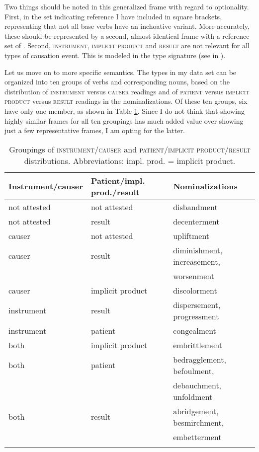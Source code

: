 Two things should be noted in this generalized frame with regard to optionality. 
First, in the set indicating reference I have included  in square brackets, representing that not all base verbs have an inchoative variant. More accurately, these should be represented by a second,  almost identical frame with a reference set of . 
Second, \textsc{instrument}, \textsc{implicit product} and \textsc{result} are not relevant for all types of causation event. This is modeled in the type signature (see  in ).

Let us move on to more specific semantics. The types in my data set can be organized into ten groups of verbs and corresponding nouns, based on the distribution of \textsc{instrument} versus \textsc{causer} readings and of \textsc{patient} versus \textsc{implicit product} versus \textsc{result} readings in the nominalizations. Of these ten groups, six have only one member, as shown in Table \ref{tab:overview-distributions}. Since I do not think that showing highly similar frames for all ten groupings has much added value over showing just a few representative frames, I am opting for the latter. 
\begin{table}
  \centering 
    \caption[Groupings of \textsc{instrument/causer} and \textsc{implicit product/patient/result} distributions]{\label{tab:overview-distributions}Groupings of \textsc{instrument/causer} and \textsc{patient/implicit product/result} distributions. Abbreviations: impl. prod. = implicit product.}
    \begin{tabular}{p{}<{\raggedright} p{4cm}<{\raggedright} p{}<{\raggedright}}
      \lsptoprule
      Instrument/causer & Patient/impl. prod./result &  Nominalizations \\
      \midrule
       not attested & not attested & disbandment \\
      not attested & result & decenterment  \\
       causer & not attested & upliftment  \\
      causer & result & diminishment, increasement,   \\
      && worsenment\\
       causer & implicit product & discolorment  \\
      instrument & result & dispersement, progressment  \\
       instrument & patient  & congealment \\
      both & implicit product & embrittlement \\
       both & patient  & bedragglement, befoulment,    \\
       &&  debauchment, unfoldment \\
      both & result & abridgement, besmirchment,  \\
      && embetterment\\
      \lspbottomrule
    \end{tabular}
\end{table}

